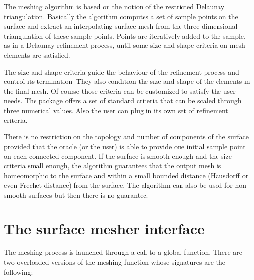 The meshing algorithm is based on the notion of the restricted
Delaunay triangulation. Basically the algorithm  computes a set of
sample points on the surface and extract an interpolating 
surface mesh  from the three dimensional triangulation of these 
sample points. Points are iteratively added to the sample,
as in a Delaunay refinement process, until some size and shape
criteria on mesh elements are satisfied. 


The size and shape criteria guide the  behaviour of
the refinement process and control its termination.
They also condition  the size and shape of the elements in the final
mesh. Of course those criteria can be customized to satisfy
the user needs. The  package offers
a set of standard criteria that can be scaled through
three numerical values. Also the user can plug in its own 
set of refinement criteria.

There is no restriction on the topology and number of components
of the surface provided that the oracle (or the user)
is able to provide one initial sample point on each connected component.
If the surface is smooth enough and the size criteria
small enough, the algorithm guarantees 
that the output mesh is homeomorphic to the
surface and within a small bounded distance
(Hausdorff or even Frechet distance) from the surface.
The algorithm can also be used for non smooth surfaces
but then there is no guarantee. 




\section{The surface mesher interface}
\label{SurfaceMesher_section_interface}

The meshing process is launched through a call to a global function.
There are two overloaded versions of the meshing function
whose signatures are the following:







